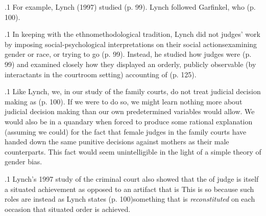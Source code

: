 \documentclass[11pt, twoside]{article}
\begin{document}
{\p.1{%
For example, Lynch (1997) studied 
(p. 99). Lynch followed Garfinkel, who  (p. 100).
}%

\p.1{%
In keeping with the ethnomethodological tradition, Lynch did not
 judges’ work by imposing social-psychological interpretations on their social actions\mdash{}examining gender or race, or trying to go
 (p. 99). Instead, he studied how judges were  (p. 99) and examined closely
how they displayed an orderly, publicly observable (by interactants in
the courtroom setting) accounting of  (p. 125).
}%

\p.1{%
Like Lynch, we, in our study of the family courts, do not treat judicial decision making as  (p. 100). If we were to do so, we might
learn nothing more about judicial decision making than our own predetermined variables would allow. We would also be in a quandary when
forced to produce some rational explanation (assuming we could) for
the fact that female judges in the family courts have handed down the
same punitive decisions against mothers as their male counterparts. This
fact would seem unintelligible in the light of a simple theory of gender
bias.
}%

\p.1{%
Lynch’s 1997 study of the criminal court also showed that the 
of judge is itself a situated achievement as opposed to an artifact that is
 This is so because such
roles are instead as Lynch states  (p. 100)\mdash{}something that is \textit{reconstituted} on
each occasion that situated order is achieved.
}%

}
\end{document}
